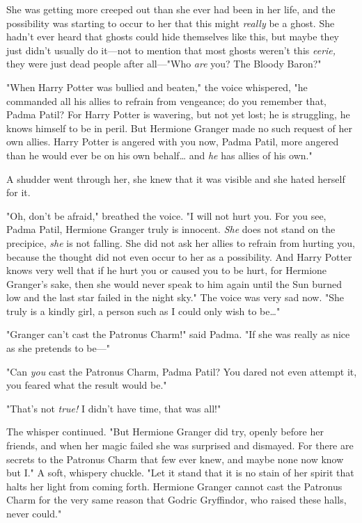 She was getting more creeped out than she ever had been in her life, and the
possibility was starting to occur to her that this might \emph{really} be a
ghost. She hadn't ever heard that ghosts could hide themselves like this, but
maybe they just didn't usually do it---not to mention that most ghosts weren't
this \emph{eerie,} they were just dead people after all---"Who \emph{are} you?
The Bloody Baron?"

"When Harry Potter was bullied and beaten," the voice whispered, "he commanded
all his allies to refrain from vengeance; do you remember that, Padma Patil?
For Harry Potter is wavering, but not yet lost; he is struggling, he knows
himself to be in peril. But Hermione Granger made no such request of her own
allies. Harry Potter is angered with you now, Padma Patil, more angered than he
would ever be on his own behalf{\ldots} and \emph{he} has allies of his own."

A shudder went through her, she knew that it was visible and she hated herself
for it.

"Oh, don't be afraid," breathed the voice. "I will not hurt you. For you see,
Padma Patil, Hermione Granger truly is innocent. \emph{She} does not stand on
the precipice, \emph{she} is not falling. She did not ask her allies to refrain
from hurting you, because the thought did not even occur to her as a
possibility. And Harry Potter knows very well that if he hurt you or caused you
to be hurt, for Hermione Granger's sake, then she would never speak to him
again until the Sun burned low and the last star failed in the night sky." The
voice was very sad now. "She truly is a kindly girl, a person such as I could
only wish to be{\ldots}"

"Granger can't cast the Patronus Charm!" said Padma. "If she was really as nice
as she pretends to be---"

"Can \emph{you} cast the Patronus Charm, Padma Patil? You dared not even
attempt it, you feared what the result would be."

"That's not \emph{true!} I didn't have time, that was all!"

The whisper continued. "But Hermione Granger did try, openly before her
friends, and when her magic failed she was surprised and dismayed. For there
are secrets to the Patronus Charm that few ever knew, and maybe none now know
but I." A soft, whispery chuckle. "Let it stand that it is no stain of her
spirit that halts her light from coming forth. Hermione Granger cannot cast the
Patronus Charm for the very same reason that Godric Gryffindor, who raised
these halls, never could."

